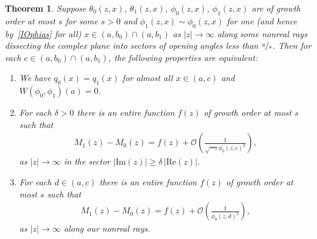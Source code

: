 \documentclass{amsart}
\newtheorem{theorem}{Theorem}[section]
\numberwithin{equation}{section}
\begin{document}
\begin{theorem}\label{thmbm}
Suppose $\theta_0(z,x)$, $\theta_1(z,x)$, $\phi_0(z,x)$, $\phi_1(z,x)$ are of growth order at most $s$ for some $s>0$ and $\phi_1(z,x) \sim \phi_0(z,x)$ for one (and hence by~\eqref{IOphias} for all) $x\in(a,b_0)\cap(a,b_1)$ as $|z|\to\infty$ along some nonreal rays dissecting the complex plane into sectors of opening angles less than $\nicefrac{\pi}{s}$.
Then for each $c\in(a,b_0)\cap(a,b_1)$, the following properties are equivalent:
\begin{enumerate}
 \item We have $q_0(x) = q_1(x)$ for almost all $x\in(a,c)$ and $W(\phi_0,\phi_1)(a)=0$.
 \item For each $\delta>0$ there is an entire function $f(z)$ of growth order at most $s$ such that
  \begin{align*}M_1(z)-M_0(z) = f(z) + {\mathcal{O}}\left(\frac{1}{\sqrt{-z} \phi_0(z,c)^{2}}\right),\end{align*}
   as $|z|\rightarrow\infty$ in the sector $|{\mathrm{Im}}(z)|\geq \delta\,|{\mathrm{Re}}(z)|$.
 \item For each $d\in(a,c)$ there is an entire function $f(z)$ of growth order at most $s$ such that
  \begin{align*}M_1(z)-M_0(z) = f(z) + {\mathcal{O}}\left(\frac{1}{\phi_0(z,d)^{2}}\right),\end{align*}
   as $|z|\rightarrow\infty$ along our nonreal rays.
\end{enumerate}
\end{theorem}
\end{document}
